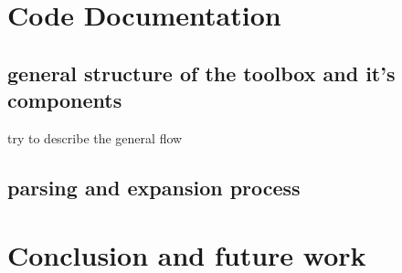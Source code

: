 \documentclass{thesul}
\begin{document}
\chapter{Code Documentation}

\section{general structure of the toolbox and it's components}
try to describe the general flow

\section{parsing and expansion process}


\chapter{Conclusion and future work}
\end{document}
